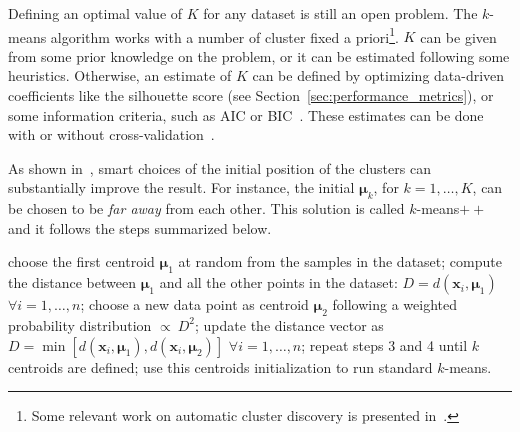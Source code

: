     Defining an optimal value of $K$ for any dataset is still an open problem. The $k$-means algorithm works with a number of cluster fixed a priori\footnote{ Some relevant work on automatic cluster discovery is presented in~\cite{ball1967clustering, pelleg2000x, muhr2009automatic}.}.
    $K$ can be given from some prior knowledge on the problem, or it can be estimated following some heuristics. Otherwise, an estimate of $K$ can be defined by optimizing data-driven coefficients like the silhouette score (see Section~\ref{sec:performance_metrics}), or some information criteria, such as \ac{AIC} or \ac{BIC}~\cite{bishop2006pattern}.
    These estimates can be done with or without cross-validation~\cite{fiorini2017adenine}.
    
    As shown in~\cite{arthur2007k}, smart choices of the initial position of the clusters can substantially improve the result. For instance, the initial $\bm{\mu}_k$, for $k=1,\dots,K$, can be chosen to be \textit{far away} from each other.
    This solution is called $k$-means$++$ and it follows the steps summarized below.

	\begin{algorithm}[h!]
		\begin{algorithmic}[1]
			\State choose the first centroid $\bm{\mu}_1$ at random from the samples in the dataset;
			\State compute the distance between $\bm{\mu}_1$ and all the other points in the dataset: $D = d(\bm{x}_i, \bm{\mu}_1)$ $\forall i=1,\dots,n$;
			\State choose a new data point as centroid $\bm{\mu}_2$ following a weighted probability distribution $\propto~D^2$;
			\State update the distance vector as $D = \min[d(\bm{x}_i, \bm{\mu}_1), d(\bm{x}_i, \bm{\mu}_2)]$ $\forall i=1,\dots,n$;
			\State repeat steps 3 and 4 until $k$ centroids are defined;
			\State use this centroids initialization to run standard $k$-means.
		\end{algorithmic}
	\end{algorithm}



